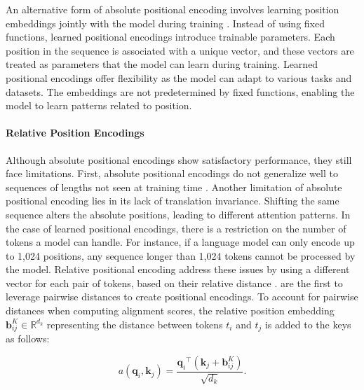 An alternative form of absolute positional encoding involves learning position embeddings jointly with the model during training \citep{devlin2018bert}. Instead of using fixed functions, learned positional encodings introduce trainable parameters. Each position in the sequence is associated with a unique vector, and these vectors are treated as parameters that the model can learn during training. Learned positional encodings offer flexibility as the model can adapt to various tasks and datasets. The embeddings are not predetermined by fixed functions, enabling the model to learn patterns related to position.

\paragraph{Relative Position Encodings}

Although absolute positional encodings show satisfactory performance, they still face limitations. First, absolute positional encodings do not generalize well to sequences of lengths not seen at training time \citep{dai2019transformer}. Another limitation of absolute positional encoding lies in its lack of translation invariance. Shifting the same sequence alters the absolute positions, leading to different attention patterns. In the case of learned positional encodings,  there is a restriction on the number of tokens a model can handle. For instance, if a language model can only encode up to 1,024 positions, any sequence longer than 1,024 tokens cannot be processed by the model. Relative positional encoding address these issues by using a different vector for each pair of tokens, based on their relative distance \citep{shaw2018self, huang2018music, ke2020rethinking}. \citet{shaw2018self} are the first to leverage pairwise distances to create positional encodings. To account for pairwise distances when computing alignment scores, the relative position embedding $\bm{b}^K_{ij} \in \mathbb{R}^{d_k}$ representing the distance between tokens $t_i$ and $t_j$ is added to the keys as follows:


\begin{equation}
    a(\bm{q}_i, \bm{k}_j) = \frac{{\bm{q}_i}^{\top} (\bm{k}_j + \bm{b}^K_{ij})}{\sqrt{d_k}}.
\end{equation}

